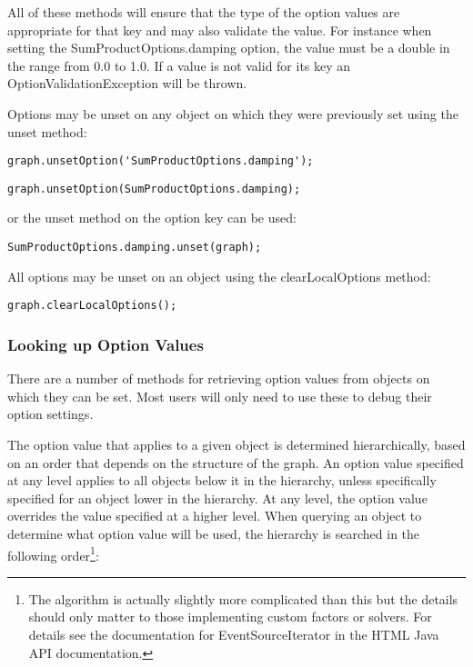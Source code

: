 \fi

All of these methods will ensure that the type of the option values are appropriate for that key and may also validate the value. For instance when setting the SumProductOptions.damping option, the value must be a double in the range from 0.0 to 1.0. If a value is not valid for its key an OptionValidationException will be thrown.

Options may be unset on any object on which they were previously set using the unset method:

\ifmatlab
\begin{lstlisting}
graph.unsetOption('SumProductOptions.damping');
\end{lstlisting}
\fi

\ifjava
\begin{lstlisting}
graph.unsetOption(SumProductOptions.damping);
\end{lstlisting}

or the unset method on the option key can be used:

\begin{lstlisting}
SumProductOptions.damping.unset(graph);
\end{lstlisting}
\fi

All options may be unset on an object using the clearLocalOptions method:

\begin{lstlisting}
graph.clearLocalOptions();
\end{lstlisting}

\subsubsection{Looking up Option Values}

There are a number of methods for retrieving option values from objects on which they can be set. Most users will only need to use these to debug their option settings.

The option value that applies to a given object is determined hierarchically, based on an order that depends on the structure of the graph.  An option value specified at any level applies to all objects below it in the hierarchy, unless specifically specified for an object lower in the hierarchy.  At any level, the option value overrides the value specified at a higher level.  When querying an object to determine what option value will be used, the hierarchy is searched in the following order\footnote{The algorithm is actually slightly more complicated than this but the details should only matter to those implementing custom factors or solvers. For details see the documentation for EventSourceIterator in the HTML Java API documentation.}:

